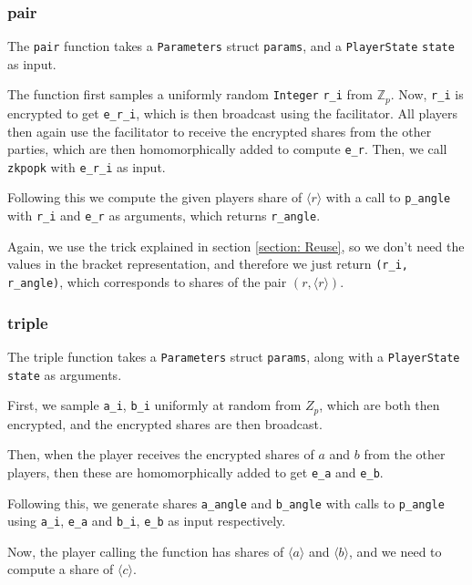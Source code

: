 \documentclass[../main.tex]{subfiles}
\begin{document}
\subsubsection{pair}
The \lstinline{pair} function takes a \lstinline{Parameters} struct \lstinline{params}, and a \lstinline{PlayerState} \lstinline{state} as input.

The function first samples a uniformly random \lstinline{Integer} \lstinline{r_i} from $\mathbb{Z}_p$. Now, \lstinline{r_i} is encrypted to get \lstinline{e_r_i}, which is then broadcast using the facilitator. All players then again use the facilitator to receive the encrypted shares from the other parties, which are then homomorphically added to compute \lstinline{e_r}. Then, we call \lstinline{zkpopk} with \lstinline{e_r_i} as input.

Following this we compute the given players share of $\langle r \rangle$ with a call to \lstinline{p_angle} with \lstinline{r_i} and \lstinline{e_r} as arguments, which returns \lstinline{r_angle}.

Again, we use the trick explained in section \ref{section: Reuse}, so we don't need the values in the bracket representation, and therefore we just return \lstinline{(r_i, r_angle)}, which corresponds to shares of the pair $(r, \langle r \rangle)$.

\subsubsection{triple}
The triple function takes a \lstinline{Parameters} struct \lstinline{params}, along with a \lstinline{PlayerState} \lstinline{state} as arguments.

First, we sample \lstinline{a_i}, \lstinline{b_i} uniformly at random from $Z_p$, which are both then encrypted, and the encrypted shares are then broadcast.

Then, when the player receives the encrypted shares of $a$ and $b$ from the other players, then these are homomorphically added to get \lstinline{e_a} and \lstinline{e_b}.

Following this, we generate shares \lstinline{a_angle} and \lstinline{b_angle} with calls to \lstinline{p_angle} using \lstinline{a_i}, \lstinline{e_a} and \lstinline{b_i}, \lstinline{e_b} as input respectively.

Now, the player calling the function has shares of $\langle a \rangle$ and $\langle b \rangle$, and we need to compute a share of $\langle c \rangle$.
\end{document}
